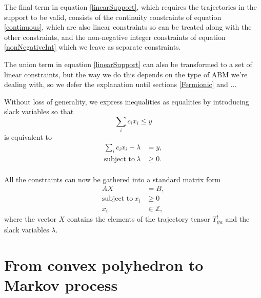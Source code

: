 The final term in equation \ref{linearSupport}, which requires the trajectories in the support to be valid, consists of the continuity constraints of equation \ref{continuous}, which are also linear constraints so can be treated along with the other constraints, and the non-negative integer constraints of equation \ref{nonNegativeInt} which we leave as separate constraints.

The union term in equation \ref{linearSupport} can also be transformed to a set of linear constraints, but the way we do this depends on the type of ABM we're dealing with, so we defer the explanation until sections \ref{Fermionic} and ...

Without loss of generality, we express inequalities as equalities by introducing slack variables so that
\[
\sum_i c_i x_i \le y
\]
is equivalent to
\[
\begin{split}
 \sum_i c_i x_i + \lambda & = y, \\
\text{subject to}\ \lambda & \ge 0. \\
\end{split}
\]

All the constraints can now be gathered into a standard matrix form
\begin{equation}
\begin{split}
AX &= B, \\
\text{subject to}\ x_i &\ge 0\\
x_i &\in \mathbb{Z},
\end{split}
\label{Axy}
\end{equation}
where the vector $X$ contains the elements of the trajectory tensor $T^t_{\psi a}$ and the slack variables $\lambda$.

\section{From convex polyhedron to Markov process}

